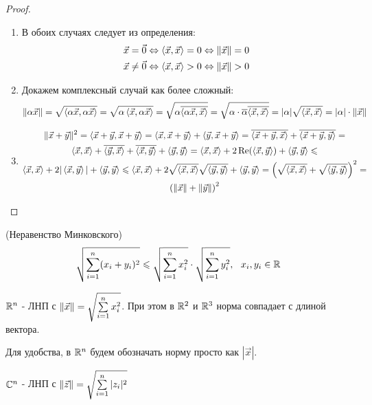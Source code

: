 \begin{proof}~
	\begin{enumerate}
		\item В обоих случаях следует из определения:
		\begin{align*}
			\vec{x} = \vec{0} \Leftrightarrow \left\langle\vec{x}, \vec{x}\right\rangle = 0 \Leftrightarrow \|\vec{x}\| = 0
			\\
			\vec{x} \neq \vec{0} \Leftrightarrow \left\langle\vec{x}, \vec{x}\right\rangle > 0 \Leftrightarrow \|\vec{x}\| > 0
		\end{align*}
		
		\item Докажем комплексный случай как более сложный:
		\[
			\|\alpha\vec{x}\| = \sqrt{\left\langle\alpha\vec{x}, \alpha\vec{x}\right\rangle} = \sqrt{\alpha\left\langle\vec{x}, \alpha\vec{x}\right\rangle} = \sqrt{\alpha\overline{\left\langle\alpha\vec{x}, \vec{x}\right\rangle}} = \sqrt{\alpha \cdot \overline{\alpha}\overline{\left\langle\vec{x}, \vec{x}\right\rangle}} = |\alpha|\sqrt{\left\langle\vec{x}, \vec{x}\right\rangle} = |\alpha| \cdot \|\vec{x}\|
		\]
		
		\item
		\begin{multline*}
			\|\vec{x} + \vec{y}\|^2 = \left\langle\vec{x} + \vec{y}, \vec{x} + \vec{y}\right\rangle = \left\langle\vec{x}, \vec{x} + \vec{y}\right\rangle + \left\langle\vec{y}, \vec{x} + \vec{y}\right\rangle = \overline{\left\langle\vec{x} + \vec{y}, \vec{x}\right\rangle} + \overline{\left\langle\vec{x} + \vec{y}, \vec{y}\right\rangle} =
			\\
			\left\langle\vec{x}, \vec{x}\right\rangle + \overline{\left\langle\vec{y}, \vec{x}\right\rangle} + \overline{\left\langle\vec{x}, \vec{y}\right\rangle} + \left\langle\vec{y}, \vec{y}\right\rangle = \left\langle\vec{x}, \vec{x}\right\rangle + 2\operatorname{Re}(\left\langle\vec{x}, \vec{y}\right\rangle) + \left\langle\vec{y}, \vec{y}\right\rangle \leqslant
			\\
			\left\langle\vec{x}, \vec{x}\right\rangle + 2 |\left\langle\vec{x}, \vec{y}\right\rangle| + \left\langle\vec{y}, \vec{y}\right\rangle \leqslant \left\langle\vec{x}, \vec{x}\right\rangle + 2 \sqrt{\left\langle\vec{x}, \vec{x}\right\rangle} \sqrt{\left\langle\vec{y}, \vec{y}\right\rangle} + \left\langle\vec{y}, \vec{y}\right\rangle = \left(\sqrt{\left\langle\vec{x}, \vec{x}\right\rangle} + \sqrt{\left\langle\vec{y}, \vec{y}\right\rangle}\right)^2 =
			\\
			\left(\|\vec{x}\| + \|\vec{y}\|\right)^2
		\end{multline*}
	\end{enumerate}
\end{proof}

\begin{corollary} (Неравенство Минковского)
	\[
		\sqrt{\sum\limits_{i = 1}^n (x_i + y_i)^2} \leqslant \sqrt{\sum\limits_{i = 1}^n x_i^2} \cdot \sqrt{\sum\limits_{i = 1}^n y_i^2},\ \ x_i, y_i \in \mathbb{R} 
	\]
\end{corollary}

\begin{lemma}
	$\mathbb{R}^n$ - ЛНП с $\|\vec{x}\| = \sqrt{\sum\limits_{i = 1}^n x_i^2}$. При этом в $\mathbb{R}^2$ и $\mathbb{R}^3$ норма совпадает с длиной вектора.
\end{lemma}

\begin{note}
	Для удобства, в $\mathbb{R}^n$ будем обозначать норму просто как $|\vec{x}|$.
\end{note}

\begin{lemma}
	$\mathbb{C}^n$ - ЛНП с $\|\vec{z}\| = \sqrt{\sum\limits_{i = 1}^n |z_i|^2}$
\end{lemma}